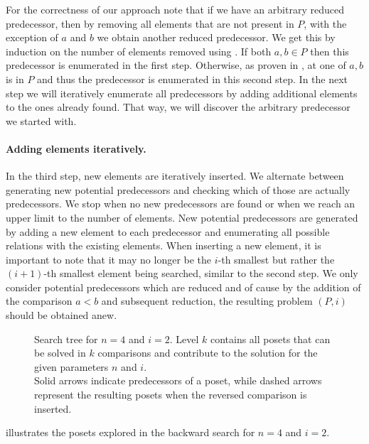 \documentclass[twoside,leqno,twocolumn]{article}
\begin{document}
For the correctness of our approach note that if we have an arbitrary reduced predecessor, then by removing all elements that are not present in $P$, with the exception of $a$ and $b$ we obtain another reduced predecessor.
We get this by induction on the number of elements removed using .
If both $a, b \in P$ then this predecessor is enumerated in the first step.
Otherwise, as proven in , at one of $a, b$ is in $P$ and thus the predecessor is enumerated in this second step.
In the next step we will iteratively enumerate all predecessors by adding additional elements to the ones already found.
That way, we will discover the arbitrary predecessor we started with.

\paragraph{Adding elements iteratively.}
In the third step, new elements are iteratively inserted.
We alternate between generating new potential predecessors and checking which of those are actually predecessors.
We stop when no new predecessors are found or when we reach an upper limit to the number of elements.
New potential predecessors are generated by adding a new element to each predecessor and enumerating all possible relations with the existing elements.
When inserting a new element, it is important to note that it may no longer be the $i$-th smallest but rather the $(i + 1)$-th smallest element being searched, similar to the second step.
We only consider potential predecessors which are reduced and of cause by the addition of the comparison $a < b$ and subsequent reduction, the resulting problem $(P, i)$ should be obtained anew.

\begin{figure}[!b]
  \centering
  
  \caption{Search tree for $n = 4$ and $i = 2$.
    Level $k$ contains all posets that can be solved in $k$ comparisons and contribute to the solution for the given parameters $n$ and $i$. \\
    Solid arrows indicate predecessors of a poset, while dashed arrows represent the resulting posets when the reversed comparison is inserted.}
  \label{fig:backward-search-tree}
\end{figure}

 illustrates the posets explored in the backward search for $n = 4$ and $i = 2$.
\end{document}
